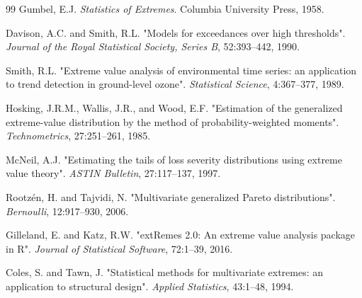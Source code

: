 \documentclass[a4paper, 11pt]{article}
\begin{document}
\begin{thebibliography}{99}
 Gumbel, E.J. \textit{Statistics of Extremes}. Columbia University
Press, 1958.

 Davison, A.C. and Smith, R.L. "Models for exceedances over high
thresholds". \textit{Journal of the Royal Statistical Society, Series B}, 52:393--442, 1990.

 Smith, R.L. "Extreme value analysis of environmental time series: an
application to trend detection in ground-level ozone". \textit{Statistical Science},
4:367--377, 1989.

 Hosking, J.R.M., Wallis, J.R., and Wood, E.F. "Estimation of the
generalized extreme-value distribution by the method of probability-weighted moments".
\textit{Technometrics}, 27:251--261, 1985.

 McNeil, A.J. "Estimating the tails of loss severity distributions
using extreme value theory". \textit{ASTIN Bulletin}, 27:117--137, 1997.

 Rootzén, H. and Tajvidi, N. "Multivariate generalized Pareto
distributions". \textit{Bernoulli}, 12:917--930, 2006.

 Gilleland, E. and Katz, R.W. "extRemes 2.0: An extreme value
analysis package in R". \textit{Journal of Statistical Software}, 72:1--39, 2016.

 Coles, S. and Tawn, J. "Statistical methods for multivariate extremes:
an application to structural design". \textit{Applied Statistics}, 43:1--48, 1994.

\end{thebibliography}
\end{document}
